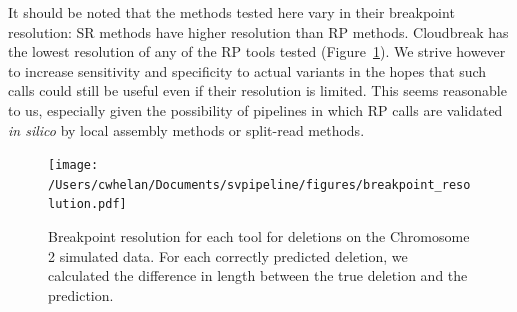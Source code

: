 \documentclass [11pt] {report}
\newcommand{\todo}[1]{}
\begin{document}
It should be noted that the methods tested here vary in their breakpoint resolution: SR methods have higher resolution than RP methods. Cloudbreak has the lowest resolution of any of the RP tools tested (Figure~\ref{breakpoint_resolution}).\todo{Cloudbreak looses resolution because...} We strive however to increase sensitivity and specificity to actual variants in the hopes that such calls could still be useful even if their resolution is limited. This seems reasonable to us, especially given the possibility of pipelines in which RP calls are validated \emph{in silico} by local assembly methods or split-read methods.

\begin{figure}
\centering
\texttt{[image: /Users/cwhelan/Documents/svpipeline/figures/breakpoint\_resolution.pdf]}
\caption{Breakpoint resolution for each tool for deletions on the Chromosome 2 simulated data. For each correctly predicted deletion, we calculated the difference in length between the true deletion and the prediction.}
\label{breakpoint_resolution}
\end{figure}
\end{document}
